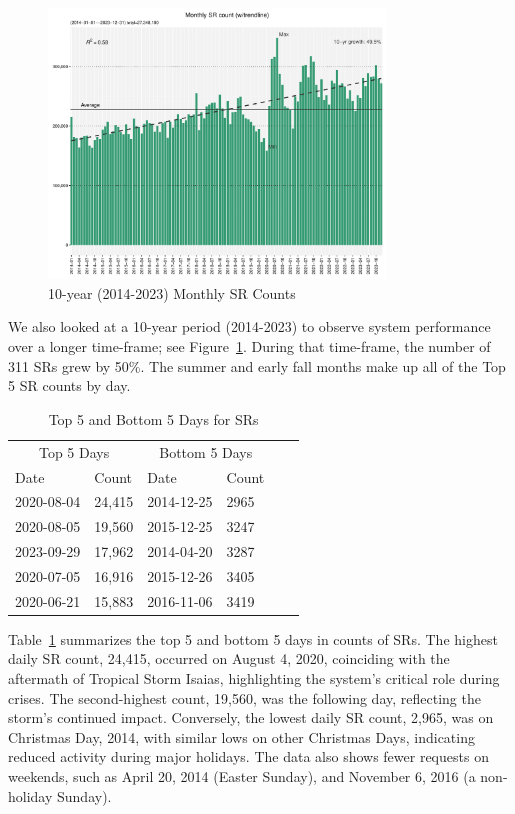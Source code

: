 \documentclass[12pt, titlepage]{article}
\begin{document}
\begin{figure}[tbp]
	\centering
  	\includegraphics[width=0.8\textwidth]{10-year-trend-monthly.pdf}
  	\caption{10-year (2014-2023) Monthly SR Counts}
  	\label{fig:10-yr-monthly}
\end{figure}

We also looked at a 10-year period (2014-2023) to
observe system performance over a longer time-frame; see
Figure~\ref{fig:10-yr-monthly}. During that time-frame,
the number of 311 SRs grew by 50\%. The summer and early fall months 
make up all of the Top 5 SR counts by day.


\begin{table}[tbp]
    \centering
    \caption{Top 5 and Bottom 5 Days for SRs}
    \label{tab:top-10-counts}
    \begin{tabular}{@{}lll lll@{}}
      \toprule
      \multicolumn{2}{c}{Top 5 Days} & \multicolumn{2}{c}{Bottom 5 Days} \\
      \cmidrule(r){1-2} \cmidrule(l){3-4}
      Date & Count & Date & Count\\
      \midrule
      2020-08-04 & 24,415 & 2014-12-25 & 2965\\
      2020-08-05 & 19,560 & 2015-12-25 & 3247\\
      2023-09-29 & 17,962 & 2014-04-20 & 3287\\
      2020-07-05 & 16,916 & 2015-12-26 & 3405\\
      2020-06-21 & 15,883 & 2016-11-06 & 3419\\
      \bottomrule
    \end{tabular}
\end{table}


Table~\ref{tab:top-10-counts} summarizes the top 5 and bottom 5 days
in counts of SRs. The highest daily SR count, 24,415, occurred on
August 4, 2020, coinciding with the aftermath of Tropical Storm
Isaias, highlighting the system's critical role during crises. The
second-highest count, 19,560, was the following day, reflecting the
storm's continued impact. 
Conversely, the lowest daily SR count, 2,965, was on Christmas Day,
2014, with similar lows on other Christmas Days, indicating reduced
activity during major holidays. The data also shows fewer requests on
weekends, such as April 20, 2014 (Easter Sunday), and November 6, 2016
(a non-holiday Sunday).
\end{document}
